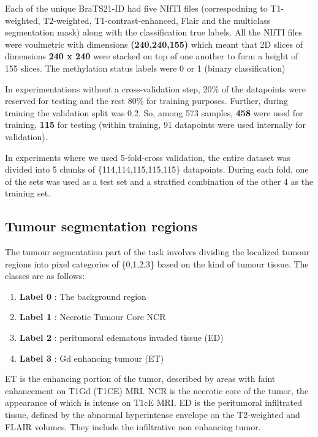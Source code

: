 Each of the unique BraTS21-ID had five NIfTI files (correspodning to T1-weighted, T2-weighted, T1-contrast-enhanced, Flair and the multiclass segmentation mask) along with the classification true labels. All the NIfTI files were voulmetric with dimensions \textbf{(240,240,155)} which meant that 2D slices of dimensions \textbf{240 x 240} were stacked on top of one another to form a height of 155 slices. The methylation status labels were 0 or 1 (binary classification)
\vspace*{3mm}

In experimentations without a cross-validation step, 20\% of the datapoints were reserved for testing and the rest 80\% for training purposes. Further, during training the validation split was 0.2. So, among 573 samples, \textbf{458} were used for training, \textbf{115} for testing (within training, 91 datapoints were used internally for validation). 
\vspace*{3mm}

In experiments where we used 5-fold-cross validation, the entire dataset was divided into 5 chunks of \{114,114,115,115,115\} datapoints. During each fold, one of the sets was used as a test set and a stratfied combination of the other 4 as the training set. 



\subsection{Tumour segmentation regions}
\vspace*{1mm} 
The tumour segmentation part of the task involves dividing the localized tumour regions into pixel categories of \{0,1,2,3\} based on the kind of tumour tissue. The classes are as follows:

\begin{enumerate}
    \item \textbf{Label 0} : The background region
    \item \textbf{Label 1} : Necrotic Tumour Core NCR
    \item \textbf{Label 2} : peritumoral edematous invaded tissue (ED)
    \item \textbf{Label 3} : Gd enhancing tumour (ET)
    
\end{enumerate}

ET is the enhancing portion of the tumor, described by areas with faint enhancement on T1Gd (T1CE) MRI. NCR is the necrotic core of the tumor, the appearance of which is intense on T1cE MRI. ED is the peritumoral infiltrated tissue, defined by the abnormal
hyperintense envelope on the T2-weighted and FLAIR volumes. They include the infiltrative non enhancing tumor. 
\vspace*{3mm}

